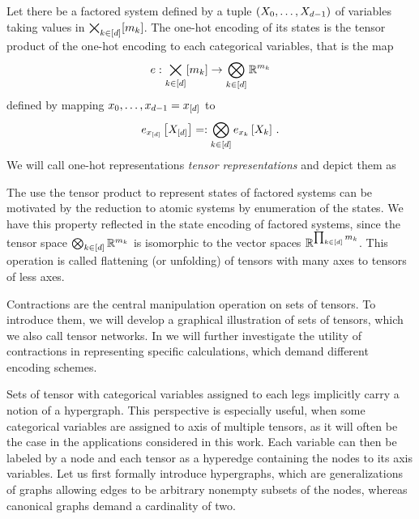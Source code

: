 \begin{definition}
	Let there be a factored system defined by a tuple $(X_{0},\ldots,X_{d-1})$ of variables taking values in $\bigtimes_{k\in[d]}[m_{k}]$.
	The one-hot encoding of its states is the tensor product of the one-hot encoding to each categorical variables, that is the map
		\[ e : \bigtimes_{k\in[d]}[m_{k}] \rightarrow  \bigotimes_{k\in[d]} \mathbb{R}^{m_{k}} \]
	defined by mapping $x_{0},\ldots,x_{d-1}=x_{[d]}$ to
	\begin{align*}
		 e_{x_{[d]}}\left[X_{[d]}\right]
		=: \bigotimes_{k\in[d]} e_{x_{k}}\left[X_{k}\right] \, .
	\end{align*}
	We will call one-hot representations \emph{tensor representations} and depict them as
	\begin{center}
		
	\end{center}
\end{definition}


\begin{remark}
	The use the tensor product to represent states of factored systems can be motivated by the reduction to atomic systems by enumeration of the states.
	We have this property reflected in the state encoding of factored systems, since the tensor space $\bigotimes_{k\in[d]}\mathbb{R}^{m_{k}}$ is isomorphic to the vector spaces $\mathbb{R}^{\prod_{k\in[d]}m_{k}}$.
	This operation is called flattening (or unfolding) of tensors with many axes to tensors of less axes.
\end{remark}




Contractions are the central manipulation operation on sets of tensors.
To introduce them, we will develop a graphical illustration of sets of tensors, which we also call tensor networks.
In  we will further investigate the utility of contractions in representing specific calculations, which demand different encoding schemes.



Sets of tensor with categorical variables assigned to each legs implicitly carry a notion of a hypergraph.
This perspective is especially useful, when some categorical variables are assigned to axis of multiple tensors, as it will often be the case in the applications considered in this work.
Each variable can then be labeled by a node and each tensor as a hyperedge containing the nodes to its axis variables.
Let us first formally introduce hypergraphs, which are generalizations of graphs allowing edges to be arbitrary nonempty subsets of the nodes, whereas canonical graphs demand a cardinality of two.

